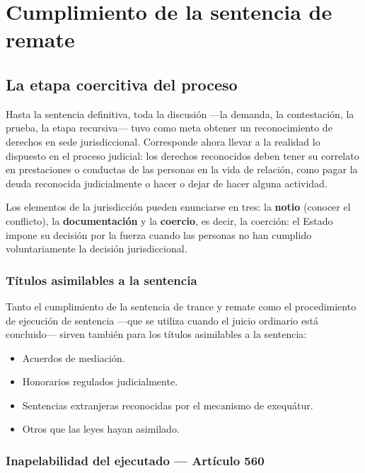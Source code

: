 \documentclass[12pt,oneside]{book}
\begin{document}
\chapter{Cumplimiento de la sentencia de remate}\label{cap:remate}


\section{La etapa coercitiva del proceso}

Hasta la sentencia definitiva, toda la discusión ---la demanda, la contestación, la prueba, la etapa recursiva--- tuvo como meta obtener un reconocimiento de derechos en sede jurisdiccional. Corresponde ahora llevar a la realidad lo dispuesto en el proceso judicial: los derechos reconocidos deben tener su correlato en prestaciones o conductas de las personas en la vida de relación, como pagar la deuda reconocida judicialmente o hacer o dejar de hacer alguna actividad.

Los elementos de la jurisdicción pueden enunciarse en tres: la \textbf{notio} (conocer el conflicto), la \textbf{documentación} y la \textbf{coercio}, es decir, la coerción: el Estado impone su decisión por la fuerza cuando las personas no han cumplido voluntariamente la decisión jurisdiccional.

\subsection{Títulos asimilables a la sentencia}

Tanto el cumplimiento de la sentencia de trance y remate como el procedimiento de ejecución de sentencia ---que se utiliza cuando el juicio ordinario está concluido--- sirven también para los títulos asimilables a la sentencia:

\begin{itemize}
    \item Acuerdos de mediación.
    \item Honorarios regulados judicialmente.
    \item Sentencias extranjeras reconocidas por el mecanismo de exequátur.
    \item Otros que las leyes hayan asimilado.
\end{itemize}

\subsection{Inapelabilidad del ejecutado --- Artículo 560}
\end{document}
